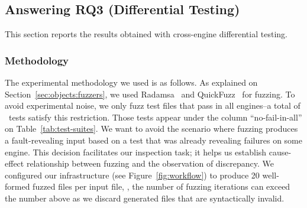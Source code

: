 \documentclass[smallextended]{svjour3}
\begin{document}
\begin{center}
\end{center}


\subsection{Answering RQ3 (Differential Testing)}
\label{sec:cross-engine-diff-testing-results}

This section reports the results obtained with cross-engine differential
testing.


\subsubsection{Methodology}
The experimental methodology we used is as follows. As explained on
Section~\ref{sec:objects:fuzzers}, we used Radamsa~\cite{radamsa} and
QuickFuzz~\cite{quickfuzz} for fuzzing. To avoid experimental noise,
we only fuzz test files that pass in all engines--a total of
\totalTestFilesPassInAll\ tests satisfy this restriction. Those tests
appear under the column ``no-fail-in-all'' on
Table~\ref{tab:test-suites}.  We want to avoid the scenario where
fuzzing produces a fault-revealing input based on a test that was
already revealing failures on some engine. This decision facilitates
our inspection task; it helps us establish cause-effect relationship
between fuzzing and the observation of discrepancy.  We configured our
infrastructure (see Figure~\ref{fig:workflow}) to produce 20
well-formed fuzzed files per input file, \ie{}, the number of fuzzing
iterations can exceed the number above as we discard generated files
that are syntactically invalid.

\end{document}
